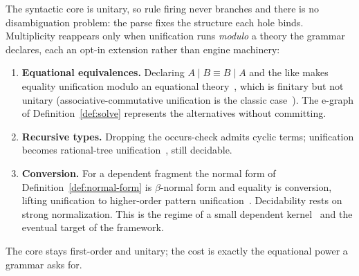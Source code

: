 The syntactic core is unitary, so rule firing never branches and there is no
disambiguation problem: the parse fixes the structure each hole binds.
Multiplicity reappears only when unification runs \emph{modulo} a theory the
grammar declares, each an opt-in extension rather than engine machinery:
\begin{enumerate}[nosep]
  \item \textbf{Equational equivalences.} Declaring $A \mid B \equiv B \mid A$
        and the like makes equality unification modulo an equational
        theory~\cite{baader2001unification}, which is finitary but not unitary
        (associative-commutative unification is the classic
        case~\cite{stickel1981}). The e-graph of Definition~\ref{def:solve}
        represents the alternatives without committing.
  \item \textbf{Recursive types.} Dropping the occurs-check admits cyclic terms;
        unification becomes rational-tree
        unification~\cite{colmerauer1982,Tiurin2024}, still decidable.
  \item \textbf{Conversion.} For a dependent fragment the normal form of
        Definition~\ref{def:normal-form} is $\beta$-normal form and equality is
        conversion, lifting unification to higher-order pattern
        unification~\cite{miller1991}. Decidability rests on strong
        normalization. This is the regime of a small dependent
        kernel~\cite{harper1993lf} and the eventual target of the framework.
\end{enumerate}
The core stays first-order and unitary; the cost is exactly the equational power
a grammar asks for.
